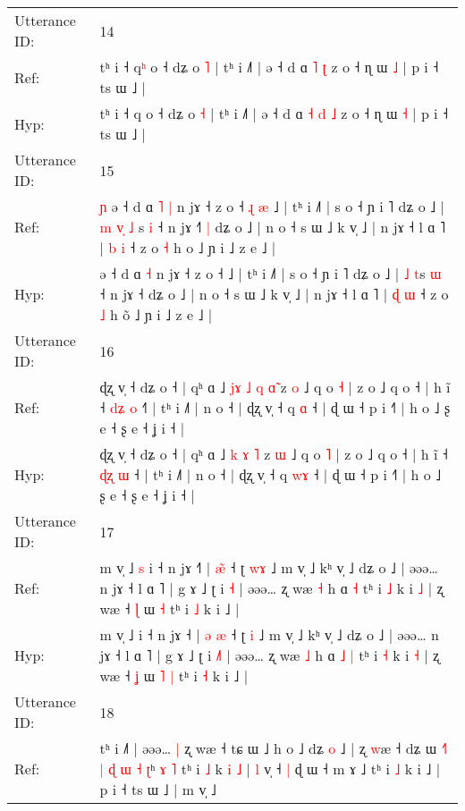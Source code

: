 \documentclass[10pt]{article}
\DeclareRobustCommand{\hl}[1]{{\textcolor{red}{#1}}}
\begin{document}
\begin{longtable}{ll}
 \\
\midrule
Utterance ID: & 14 \\
Ref: & tʰ i ˧ q\hl{ʰ} o ˧ dʑ o \hl{˥} | tʰ i ˩˥ | ə ˧ d ɑ\hl{}\hl{} \hl{˥} \hl{ʈ} z o ˧ ɳ ɯ \hl{˩} | p i ˧ ts ɯ ˩ |
 \\
Hyp: & tʰ i ˧ q\hl{} o ˧ dʑ o \hl{˧} | tʰ i ˩˥ | ə ˧ d ɑ\hl{ }\hl{˧} \hl{d} \hl{˩} z o ˧ ɳ ɯ \hl{˧} | p i ˧ ts ɯ ˩ |
 \\
\midrule
Utterance ID: & 15 \\
Ref: & \hl{ɲ}\hl{ }ə ˧ d ɑ\hl{ }\hl{˥} \hl{|} n jɤ ˧ z o ˧\hl{ }\hl{ɻ}\hl{ }\hl{æ} ˩ | tʰ i ˩˥ | s o ˧ ɲ i ˥ dʑ o ˩ |\hl{ }\hl{m} \hl{v}\hl{̩} \hl{˩}\hl{ }s \hl{i} ˧ n jɤ ˧\hl{˥}\hl{ }\hl{|} dʑ o ˩ | n o ˧ s ɯ ˩ k v̩ ˩ | n jɤ ˧ l ɑ ˥ | \hl{b} \hl{i} ˧ z o \hl{˧} h o\hl{} ˩ ɲ i ˩ z e ˩ |
 \\
Hyp: & \hl{}\hl{}ə ˧ d ɑ\hl{}\hl{} \hl{˧} n jɤ ˧ z o ˧\hl{}\hl{}\hl{}\hl{} ˩ | tʰ i ˩˥ | s o ˧ ɲ i ˥ dʑ o ˩ |\hl{}\hl{} \hl{}\hl{˩} \hl{}\hl{t}s \hl{ɯ} ˧ n jɤ ˧\hl{}\hl{}\hl{} dʑ o ˩ | n o ˧ s ɯ ˩ k v̩ ˩ | n jɤ ˧ l ɑ ˥ | \hl{ɖ} \hl{ɯ} ˧ z o \hl{˩} h o\hl{̃} ˩ ɲ i ˩ z e ˩ |
 \\
\midrule
Utterance ID: & 16 \\
Ref: & ɖʐ v̩ ˧ dʑ o ˧ | qʰ ɑ ˩\hl{ }\hl{j}\hl{ɤ} \hl{˩} \hl{q} \hl{ɑ}\hl{̃} z \hl{o} ˩ q o \hl{˧} | z o ˩ q o ˧ | h ĩ ˧ \hl{d}\hl{ʑ} \hl{o} ˧\hl{˥} | tʰ i ˩˥ | n o ˧ | ɖʐ v̩ ˧ q \hl{}\hl{ɑ} ˧ | ɖ ɯ ˧ p i ˧˥ | h o ˩ ʂ e ˧ ʂ e ˧ ʝ i ˧ |
 \\
Hyp: & ɖʐ v̩ ˧ dʑ o ˧ | qʰ ɑ ˩\hl{}\hl{}\hl{} \hl{k} \hl{ɤ} \hl{}\hl{˥} z \hl{ɯ} ˩ q o \hl{˥} | z o ˩ q o ˧ | h ĩ ˧ \hl{ɖ}\hl{ʐ} \hl{ɯ} ˧\hl{} | tʰ i ˩˥ | n o ˧ | ɖʐ v̩ ˧ q \hl{w}\hl{ɤ} ˧ | ɖ ɯ ˧ p i ˧˥ | h o ˩ ʂ e ˧ ʂ e ˧ ʝ i ˧ |
 \\
\midrule
Utterance ID: & 17 \\
Ref: & m v̩ ˩\hl{ }\hl{s} i ˧ n jɤ ˧\hl{˥} | \hl{}\hl{æ}\hl{̃} ˧ ʈ \hl{w}\hl{ɤ} ˩ m v̩ ˩ kʰ v̩ ˩ dʑ o ˩ | əəə… n jɤ ˧ l ɑ ˥ | g ɤ ˩ ʈ i \hl{}\hl{˧} | əəə… ʐ wæ \hl{˧} h ɑ\hl{}\hl{} \hl{˧} tʰ i \hl{˩} k i \hl{˩} | ʐ wæ ˧ \hl{ɭ} ɯ\hl{}\hl{} \hl{˧} tʰ i \hl{˩} k i ˩ |
 \\
Hyp: & m v̩ ˩\hl{}\hl{} i ˧ n jɤ ˧\hl{} | \hl{ə}\hl{ }\hl{æ} ˧ ʈ \hl{}\hl{i} ˩ m v̩ ˩ kʰ v̩ ˩ dʑ o ˩ | əəə… n jɤ ˧ l ɑ ˥ | g ɤ ˩ ʈ i \hl{˩}\hl{˥} | əəə… ʐ wæ \hl{˩} h ɑ\hl{ }\hl{˩} \hl{|} tʰ i \hl{˧} k i \hl{˧} | ʐ wæ ˧ \hl{ʝ} ɯ\hl{ }\hl{˥} \hl{|} tʰ i \hl{˧} k i ˩ |
 \\
\midrule
Utterance ID: & 18 \\
Ref: & tʰ i ˩˥ | əəə…\hl{ }\hl{|} ʐ wæ ˧ tɕ ɯ ˩ h o ˩ dʑ\hl{ }\hl{o} ˩ | ʐ \hl{w}æ ˧ dʑ ɯ \hl{˧}˥ \hl{}\hl{|} \hl{ɖ} \hl{ɯ} \hl{˧} \hl{ʈ}ʰ \hl{ɤ} \hl{˥} tʰ i \hl{˩} k\hl{ }\hl{i} \hl{˩} | \hl{l} v̩ ˧\hl{ }\hl{|} ɖ ɯ ˧ m ɤ ˩ tʰ i \hl{˩} k i ˩ | p i ˧ ts ɯ ˩ | m v̩ ˩

\end{longtable}
\end{document}
